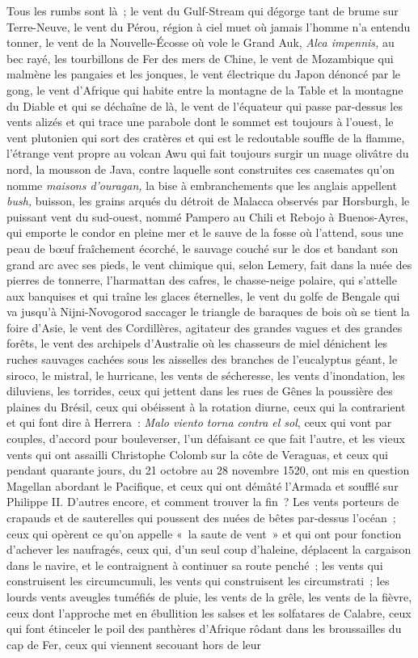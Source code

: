 \documentclass[french,twoside]{book} %
\begin{document}
Tous les rumbs sont là ; le vent du Gulf-Stream qui dégorge tant de brume sur Terre-Neuve, le vent du Pérou, région à ciel muet où jamais l’homme n’a entendu tonner, le vent de la Nouvelle-Écosse où vole le Grand Auk, \emph{Alca impennis,} au bec rayé, les tourbillons de Fer des mers de Chine, le vent de Mozambique qui  malmène les pangaies et les jonques, le vent électrique du Japon dénoncé par le gong, le vent d’Afrique qui habite entre la montagne de la Table et la montagne du Diable et qui se déchaîne de là, le vent de l’équateur qui passe par-dessus les vents alizés et qui trace une parabole dont le sommet est toujours à l’ouest, le vent plutonien qui sort des cratères et qui est le redoutable souffle de la flamme, l’étrange vent propre au volcan Awu qui fait toujours surgir un nuage olivâtre du nord, la mousson de Java, contre laquelle sont construites ces casemates qu’on nomme \emph{maisons d’ouragan,} la bise à embranchements que les anglais appellent \emph{bush,} buisson, les grains arqués du détroit de Malacca observés par Horsburgh, le puissant vent du sud-ouest, nommé Pampero au Chili et Rebojo à Buenos-Ayres, qui emporte le condor en pleine mer et le sauve de la fosse où l’attend, sous une peau de bœuf fraîchement écorché, le sauvage couché sur le dos et bandant son grand arc avec ses pieds, le vent chimique qui, selon Lemery, fait dans la nuée des pierres de tonnerre, l’harmattan des cafres, le chasse-neige polaire, qui s’attelle aux banquises et qui traîne les glaces éternelles, le vent du golfe de Bengale qui va jusqu’à Nijni-Novogorod saccager le triangle de baraques de bois où se tient la foire d’Asie, le vent des Cordillères, agitateur des grandes vagues et des grandes forêts, le vent des archipels d’Australie où les chasseurs de miel dénichent les ruches sauvages cachées sous les aisselles des branches de l’eucalyptus géant, le siroco, le mistral, le hurricane, les vents de sécheresse,  les vents d’inondation, les diluviens, les torrides, ceux qui jettent dans les rues de Gênes la poussière des plaines du Brésil, ceux qui obéissent à la rotation diurne, ceux qui la contrarient et qui font dire à Herrera : \emph{Malo viento torna contra el sol}, ceux qui vont par couples, d’accord pour bouleverser, l’un défaisant ce que fait l’autre, et les vieux vents qui ont assailli Christophe Colomb sur la côte de Veraguas, et ceux qui pendant quarante jours, du 21 octobre au 28 novembre 1520, ont mis en question Magellan abordant le Pacifique, et ceux qui ont démâté l’Armada et soufflé sur Philippe II. D’autres encore, et comment trouver la fin ? Les vents porteurs de crapauds et de sauterelles qui poussent des nuées de bêtes par-dessus l’océan ; ceux qui opèrent ce qu’on appelle « la saute de vent » et qui ont pour fonction d’achever les naufragés, ceux qui, d’un seul coup d’haleine, déplacent la cargaison dans le navire, et le contraignent à continuer sa route penché ; les vents qui construisent les circumcumuli, les vents qui construisent les circumstrati ; les lourds vents aveugles tuméfiés de pluie, les vents de la grêle, les vents de la fièvre, ceux dont l’approche met en ébullition les salses et les solfatares de Calabre, ceux qui font étinceler le poil des panthères d’Afrique rôdant dans les broussailles du cap de Fer, ceux qui viennent secouant hors de leur 
\end{document}
